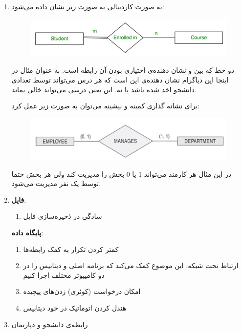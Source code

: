 \begin{enumerate}
    \item به صورت کاردینالی به صورت زیر نشان داده می‌شود:
    \begin{figure}[H]
        \centering \includegraphics[scale=0.4]{pics/nullable1.jpg}
    \end{figure}
    دو خط که بین
     و 
    نشان دهنده‌ی اختیاری بودن آن رابطه است. به عنوان مثال در اینجا این دیاگرام نشان دهنده‌ی این است
    که هر درس می‌تواند توسط تعدادی دانشجو اخذ شده باشد یا نه. این یعنی درسی می‌تواند خالی بماند.

    \noindent
    برای نشانه گذاری کمینه و بیشینه می‌توان به صورت زیر عمل کرد:
    \begin{figure}[H]
        \centering \includegraphics[scale=0.4]{pics/nullable2.jpg}
    \end{figure}
    در این مثال هر کارمند می‌تواند 1 یا 0 بخش را مدیریت کند ولی هر بخش حتما توسط یک نفر مدیریت می‌شود.
    \item \textbf{فایل}:
    \begin{enumerate}
        \item سادگی در ذخیره‌سازی فایل
    \end{enumerate}
    \textbf{پایگاه داده}:
    \begin{enumerate}
        \item کمتر کردن تکرار به کمک رابطه‌ها
        \item ارتباط تحت شبکه. این موضوع کمک می‌کند که برنامه‌ اصلی و دیتابیس را در دو کامپیوتر مختلف اجرا کنیم
        \item امکان درخواست (کوئری) زدن‌های پیچیده
        \item هندل کردن اتوماتیک  در خود دیتابیس
    \end{enumerate}
    \item رابطه‌ی دانشجو و دپارتمان
\end{enumerate}



